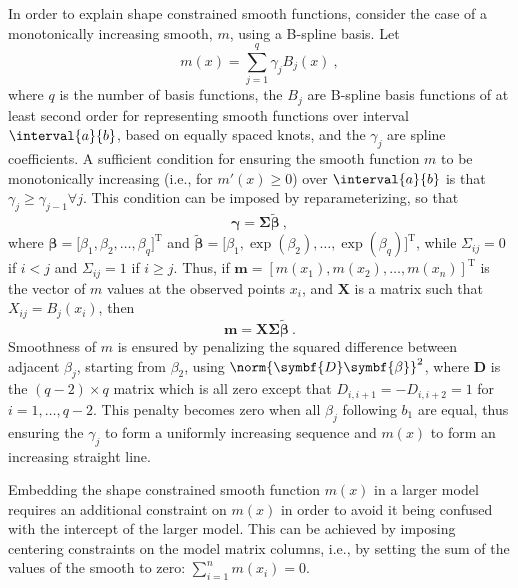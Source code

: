 In order to explain shape constrained smooth functions, consider the case of a monotonically increasing smooth, \(m\), using a B-spline basis.  Let
\begin{equation}
  \label{eq:SCAMMonotonicallyIncreasingSmooth}
  m(x) = \sum_{j = 1}^q \gamma_j B_j(x)~,
\end{equation}
where \(q\) is the number of basis functions, the \(B_j\) are B-spline basis functions of at least second order for representing smooth functions over interval \(\interval{a}{b}\), based on equally spaced knots, and the \(\gamma_j\) are spline coefficients.  A sufficient condition for ensuring the smooth function \(m\) to be monotonically increasing (i.e., for \(m'(x) \geq 0\)) over \(\interval{a}{b}\) is that \(\gamma_j \geq \gamma_{j -1} \forall j\).  This condition can be imposed by reparameterizing, so that
\begin{equation}
  \label{eq:SCAMReparameterizedGamma}
  \symbf{\gamma} = \symbf{\Sigma} \tilde{\symbf{\beta}}~,
\end{equation}
where \(\symbf{\beta} = \bigl[\beta_1, \beta_2, \ldots, \beta_q\bigr]^{\text{T}}\) and \(\tilde{\symbf{\beta}} = \bigl[\beta_1, \exp(\beta_2), \ldots, \exp(\beta_q)\bigr]^{\text{T}}\), while \(\Sigma_{i j} = 0\) if \(i < j\) and \(\Sigma_{i j} = 1\) if \(i \geq j\).  Thus, if \(\symbf{m} = [m(x_1), m(x_2), \ldots, m(x_n)]^{\text{T}}\) is the vector of \(m\) values at the observed points \(x_i\), and \(\symbf{X}\) is a matrix such that \(X_{i j} = B_j(x_i)\), then
\begin{equation}
  \label{eq:SCAMConstrainedSmootherVector}
  \symbf{m} = \symbf{X} \symbf{\Sigma} \tilde{\symbf{\beta}}~.
\end{equation}
Smoothness of \(m\) is ensured by penalizing the squared difference between adjacent \(\beta_j\), starting from \(\beta_2\), using \(\norm{\symbf{D} \symbf{\beta}}^2\), where \(\symbf{D}\) is the \((q-2) \times q\) matrix which is all zero except that \(D_{i, i + 1} = - D_{i, i + 2} = 1\) for \(i = 1, \ldots, q - 2\).  This penalty becomes zero when all \(\beta_j\) following \(b_1\) are equal, thus ensuring the \(\gamma_j\) to form a uniformly increasing sequence and \(m(x)\) to form an increasing straight line.

Embedding the shape constrained smooth function \(m(x)\) in a larger model requires an additional constraint on \(m(x)\) in order to avoid it being confused with the intercept of the larger model.  This can be achieved by imposing centering constraints on the model matrix columns, i.e., by setting the sum of the values of the smooth to zero: \(\sum_{i = 1}^n m(x_i) = 0\).

